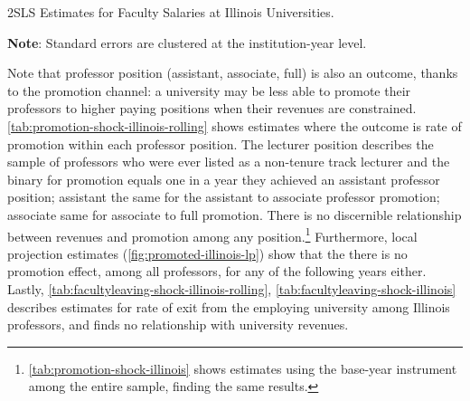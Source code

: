\begin{table}[h!]
    \singlespacing
    \centering
    \caption{2SLS Estimates for Faculty Salaries at Illinois Universities.}
    \makebox[\textwidth][c]{}
    \begin{flushleft}
        \footnotesize
        \textbf{Note}: Standard errors are clustered at the institution-year level.
    \end{flushleft}
    \label{tab:facultysalaries-shock-illinois-rolling}
\end{table}

Note that professor position (assistant, associate, full) is also an outcome, thanks to the promotion channel: a university may be less able to promote their professors to higher paying positions when their revenues are constrained.
\autoref{tab:promotion-shock-illinois-rolling} shows estimates where the outcome is rate of promotion within each professor position.
The lecturer position describes the sample of professors who were ever listed as a non-tenure track lecturer and the binary for promotion equals one in a year they achieved an assistant professor position; assistant the same for the assistant to associate professor promotion; associate same for associate to full promotion.
There is no discernible relationship between revenues and promotion among any position.\footnote{
    \autoref{tab:promotion-shock-illinois} shows estimates using the base-year instrument among the entire sample, finding the same results.
}
Furthermore, local projection estimates (\autoref{fig:promoted-illinois-lp}) show that the there is no promotion effect, among all professors, for any of the following years either.
Lastly, \autoref{tab:facultyleaving-shock-illinois-rolling}, \ref{tab:facultyleaving-shock-illinois} describes estimates for rate of exit from the employing university among Illinois professors, and finds no relationship with university revenues.
